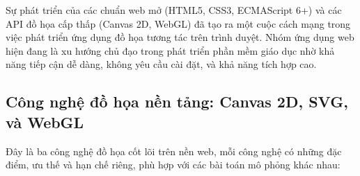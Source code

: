 Sự phát triển của các chuẩn web mở (HTML5, CSS3, ECMAScript 6+) và các API đồ họa cấp thấp (Canvas 2D, WebGL) đã tạo ra một cuộc cách mạng trong việc phát triển ứng dụng đồ họa tương tác trên trình duyệt. Nhóm ứng dụng web hiện đang là xu hướng chủ đạo trong phát triển phần mềm giáo dục nhờ khả năng tiếp cận dễ dàng, không yêu cầu cài đặt, và khả năng tích hợp cao.

\subsection{Công nghệ đồ họa nền tảng: Canvas 2D, SVG, và WebGL}

Đây là ba công nghệ đồ họa cốt lõi trên nền web, mỗi công nghệ có những đặc điểm, ưu thế và hạn chế riêng, phù hợp với các bài toán mô phỏng khác nhau:

